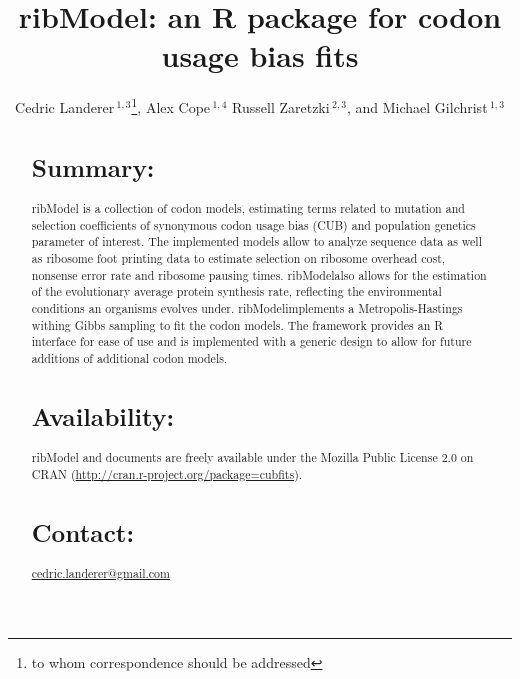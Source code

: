 \documentclass{bioinfo}
\newcommand{\pkg}[1]{{\fontseries{b}\selectfont #1}}
\let\proglang=\textsf
\newcommand{\package}{ribModel}
\begin{document}

\title[ribModel]{ribModel: an \proglang{R} package for codon usage bias fits}
\author[
Landerer \textit{et~al}]{Cedric Landerer\,$^{1,3}$\footnote{
to whom correspondence should be addressed
},
Alex Cope\,$^{1,4}$
Russell Zaretzki\,$^{2,3}$, and
Michael Gilchrist\,$^{1,3}$
}
\address{$^{1}$
Department of Ecology and Evolutionary Biology,
$^{2}$Department of Statistics, Operations, and Management Science, and
$^{3}$National Institute for Mathematical and Biological Synthesis,
University of Tennessee, Knoxville, TN, USA,
$^{4}$Oak Ridge National Labratory, Oak Ridge, TN, USA} 


\maketitle

\begin{abstract}

\section{Summary:}
\pkg{\package} is a collection of codon models, estimating terms related to mutation and selection coefficients of synonymous codon usage bias (CUB) and population genetics parameter of interest. 
The implemented models allow to analyze sequence data as well as ribosome foot printing data to estimate selection on ribosome overhead cost, nonsense error rate and ribosome pausing times. 
\package also allows for the estimation of the evolutionary average protein synthesis rate, reflecting the environmental conditions an organisms evolves under. 
\package implements a Metropolis-Hastings withing Gibbs sampling to fit the codon models.
The framework provides an R interface for ease of use and is implemented with a generic design to allow for future additions of additional codon models.

\section{Availability:}
\pkg{\package} and documents are freely available under the Mozilla Public License 2.0
on CRAN (\url{http://cran.r-project.org/package=cubfits}).

\section{Contact:} \href{cedric.landerer@gmail.com}{cedric.landerer@gmail.com}
\end{abstract}
\end{document}

